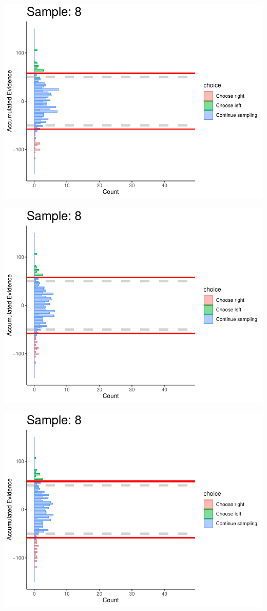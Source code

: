 \documentclass[
]{book}
\begin{document}
\begin{center}\includegraphics[width=0.8\linewidth]{LateNightBayes_files/figure-latex/fixed_dcb-76} \end{center}

\begin{center}\includegraphics[width=0.8\linewidth]{LateNightBayes_files/figure-latex/fixed_dcb-77} \end{center}

\begin{center}\includegraphics[width=0.8\linewidth]{LateNightBayes_files/figure-latex/fixed_dcb-78} \end{center}
\end{document}
